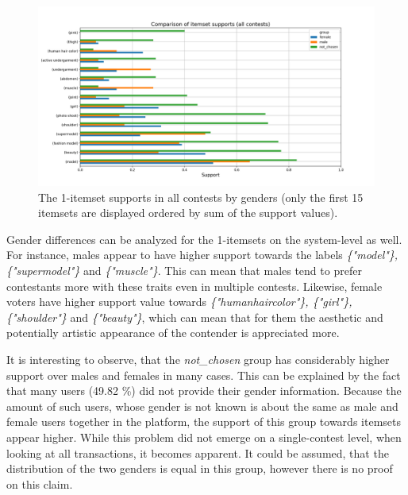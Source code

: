 \begin{figure}[h] 
    \begin{center}
        \includegraphics[width=1.0\textwidth]{Images/itemset_supports-gender-all_contests-1_itemset.png}
        \caption{The 1-itemset supports in all contests by genders (only the first 15 itemsets are displayed ordered by sum of the support values).}
        \label{itemset_supports-gender-all_contests-1_itemset}
    \end{center}
\end{figure}

Gender differences can be analyzed for the 1-itemsets on the system-level as well. For instance, males appear to have higher support towards the labels \emph{\{"model"\}, \{"supermodel"\}} and \emph{\{"muscle"\}}. This can mean that males tend to prefer contestants more with these traits even in multiple contests. Likewise, female voters have higher support value towards \emph{\{"human\:hair\:color"\}, \{"girl"\}, \{"shoulder"\}} and \emph{\{"beauty"\}}, which can mean that for them the aesthetic and potentially artistic appearance of the contender is appreciated more. 

It is interesting to observe, that the \emph{not\_chosen} group has considerably higher support over males and females in many cases. This can be explained by the fact that many users (49.82 \%) did not provide their gender information. Because the amount of such users, whose gender is not known is about the same as male and female users together in the platform, the support of this group towards itemsets appear higher. While this problem did not emerge on a single-contest level, when looking at all transactions, it becomes apparent. It could be assumed, that the distribution of the two genders is equal in this group, however there is no proof on this claim. 

